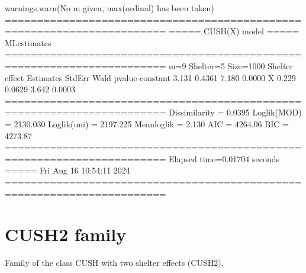 \documentclass[letterpaper,10pt,english]{sphinxmanual}
\begin{document}
\begin{sphinxVerbatim}[commandchars=\\\{\}]
warnings.warn(\PYGZdq{}No m given, max(ordinal) has been taken\PYGZdq{})
=======================================================================
=====\PYGZgt{}\PYGZgt{}\PYGZgt{} CUSH(X) model \PYGZlt{}\PYGZlt{}\PYGZlt{}===== ML\PYGZhy{}estimates
=======================================================================
m=9  Shelter=5  Size=1000
\PYGZhy{}\PYGZhy{}\PYGZhy{}\PYGZhy{}\PYGZhy{}\PYGZhy{}\PYGZhy{}\PYGZhy{}\PYGZhy{}\PYGZhy{}\PYGZhy{}\PYGZhy{}\PYGZhy{}\PYGZhy{}\PYGZhy{}\PYGZhy{}\PYGZhy{}\PYGZhy{}\PYGZhy{}\PYGZhy{}\PYGZhy{}\PYGZhy{}\PYGZhy{}\PYGZhy{}\PYGZhy{}\PYGZhy{}\PYGZhy{}\PYGZhy{}\PYGZhy{}\PYGZhy{}\PYGZhy{}\PYGZhy{}\PYGZhy{}\PYGZhy{}\PYGZhy{}\PYGZhy{}\PYGZhy{}\PYGZhy{}\PYGZhy{}\PYGZhy{}\PYGZhy{}\PYGZhy{}\PYGZhy{}\PYGZhy{}\PYGZhy{}\PYGZhy{}\PYGZhy{}\PYGZhy{}\PYGZhy{}\PYGZhy{}\PYGZhy{}\PYGZhy{}\PYGZhy{}\PYGZhy{}\PYGZhy{}\PYGZhy{}\PYGZhy{}\PYGZhy{}\PYGZhy{}\PYGZhy{}\PYGZhy{}\PYGZhy{}\PYGZhy{}\PYGZhy{}\PYGZhy{}\PYGZhy{}\PYGZhy{}\PYGZhy{}\PYGZhy{}\PYGZhy{}\PYGZhy{}
Shelter effect
          Estimates  StdErr    Wald  p\PYGZhy{}value
constant     \PYGZhy{}3.131  0.4361  \PYGZhy{}7.180   0.0000
X             0.229  0.0629   3.642   0.0003
=======================================================================
Dissimilarity = 0.0395
Loglik(MOD)   = \PYGZhy{}2130.030
Loglik(uni)   = \PYGZhy{}2197.225
Mean\PYGZhy{}loglik   = \PYGZhy{}2.130
\PYGZhy{}\PYGZhy{}\PYGZhy{}\PYGZhy{}\PYGZhy{}\PYGZhy{}\PYGZhy{}\PYGZhy{}\PYGZhy{}\PYGZhy{}\PYGZhy{}\PYGZhy{}\PYGZhy{}\PYGZhy{}\PYGZhy{}\PYGZhy{}\PYGZhy{}\PYGZhy{}\PYGZhy{}\PYGZhy{}\PYGZhy{}\PYGZhy{}\PYGZhy{}\PYGZhy{}\PYGZhy{}\PYGZhy{}\PYGZhy{}\PYGZhy{}\PYGZhy{}\PYGZhy{}\PYGZhy{}\PYGZhy{}\PYGZhy{}\PYGZhy{}\PYGZhy{}\PYGZhy{}\PYGZhy{}\PYGZhy{}\PYGZhy{}\PYGZhy{}\PYGZhy{}\PYGZhy{}\PYGZhy{}\PYGZhy{}\PYGZhy{}\PYGZhy{}\PYGZhy{}\PYGZhy{}\PYGZhy{}\PYGZhy{}\PYGZhy{}\PYGZhy{}\PYGZhy{}\PYGZhy{}\PYGZhy{}\PYGZhy{}\PYGZhy{}\PYGZhy{}\PYGZhy{}\PYGZhy{}\PYGZhy{}\PYGZhy{}\PYGZhy{}\PYGZhy{}\PYGZhy{}\PYGZhy{}\PYGZhy{}\PYGZhy{}\PYGZhy{}\PYGZhy{}\PYGZhy{}
AIC = 4264.06
BIC = 4273.87
=======================================================================
Elapsed time=0.01704 seconds =====\PYGZgt{}\PYGZgt{}\PYGZgt{} Fri Aug 16 10:54:11 2024
=======================================================================
\end{sphinxVerbatim}

\noindent{}


\section{CUSH2 family}
\label{\detokenize{manual:cush2-family}}
\sphinxAtStartPar
Family of the class CUSH with two shelter effects (CUSH2).
\end{document}
